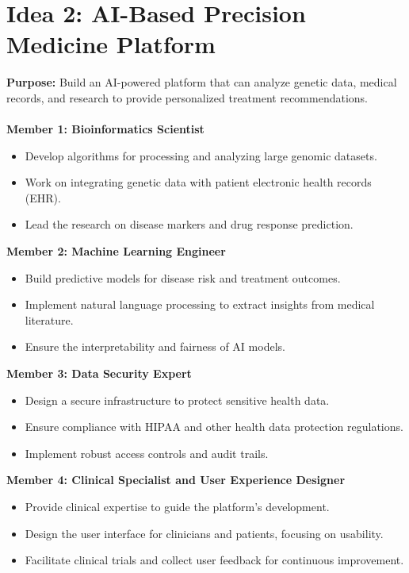 \documentclass{article}
\begin{document}
\newpage \section{Idea 2: AI-Based Precision Medicine Platform}
    \textbf{Purpose:} Build an AI-powered platform that can analyze genetic data, medical records, and research to provide personalized treatment recommendations. \\ \\
    \textbf{Member 1: Bioinformatics Scientist}
        \begin{itemize}
            \item Develop algorithms for processing and analyzing large genomic datasets.
            \item Work on integrating genetic data with patient electronic health records (EHR).
            \item Lead the research on disease markers and drug response prediction.
        \end{itemize}
    \textbf{Member 2: Machine Learning Engineer}
        \begin{itemize}
            \item Build predictive models for disease risk and treatment outcomes.
            \item Implement natural language processing to extract insights from medical literature.
            \item Ensure the interpretability and fairness of AI models.
        \end{itemize}
    \textbf{Member 3: Data Security Expert}
        \begin{itemize}
            \item Design a secure infrastructure to protect sensitive health data.
            \item Ensure compliance with HIPAA and other health data protection regulations.
            \item Implement robust access controls and audit trails.
        \end{itemize}
    \textbf{Member 4: Clinical Specialist and User Experience Designer}
        \begin{itemize}
            \item Provide clinical expertise to guide the platform's development.
            \item Design the user interface for clinicians and patients, focusing on usability.
            \item Facilitate clinical trials and collect user feedback for continuous improvement.
        \end{itemize}
\end{document}
